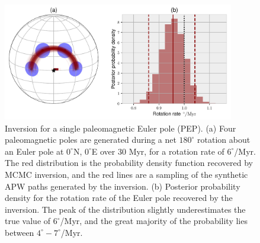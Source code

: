 \documentclass[preprint,12pt,authoryear]{elsarticle}
\begin{document}
\begin{figure}
\includegraphics[width=0.9\textwidth]{figures/synthetic/one_euler_pole.pdf}
\caption[Inversion for a single paleomagnetic Euler pole.]{Inversion for a single paleomagnetic Euler pole (PEP). (a) Four paleomagnetic poles are generated during a net $180^\circ$ rotation about an Euler pole at $0^\circ$N, $0^\circ$E over 30 Myr, for a rotation rate of $6^\circ$/Myr. The red distribution is the probability density function recovered by MCMC inversion, and the red lines are a sampling of the synthetic APW paths generated by the inversion. (b) Posterior probability density for the rotation rate of the Euler pole recovered by the inversion. The peak of the distribution slightly underestimates the true value of $6^\circ$/Myr, and the great majority of the probability lies between $4^\circ-7^\circ$/Myr. }
\label{fig:one_euler_pole}
\end{figure}
\end{document}
